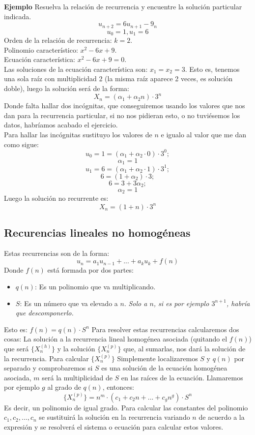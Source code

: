 \documentclass[a4paper]{article}
\theoremstyle{plain} \newtheorem{PrimerPrincipio}{Teorema}
\theoremstyle{plain} \newtheorem{SegundoPrincipio}{Teorema}
\begin{document}
\large{\textbf{Ejemplo}}
Resuelva la relación de recurrencia y encuentre la solución particular indicada.
$$u_{n+2}=6u_{n+1}-9_n$$
$$u_0=1, u_1=6$$
Orden de la relación de recurrencia: $k=2$.\\
Polinomio característico: $x^2-6x+9$.\\
Ecuación característica: $x^2-6x+9=0$.\\
Las soluciones de la ecuación característica son: $x_1=x_2=3$. Esto es, tenemos una sola raíz con multiplicidad 2 (la misma raíz aparece 2 veces, es solución doble), luego la solución será de la forma:
$$X_n=(\alpha_1+\alpha_2n)\cdot 3^n$$
Donde falta hallar dos incógnitas, que conseguiremos usando los valores que nos dan para la recurrencia particular, si no nos pidieran esto, o no tuviésemos los datos, habríamos acabado el ejercicio.\\
Para hallar las incógnitas sustituyo los valores de $n$ e igualo al valor que me dan como sigue:
$$u_0=1=(\alpha_1+\alpha_2\cdot 0)\cdot 3^0;$$
$$\alpha_1=1$$
$$u_1=6=(\alpha_1+\alpha_2\cdot 1)\cdot 3^1;$$
$$6=(1+\alpha_2)\cdot 3;$$
$$6=3+3\alpha_2;$$
$$\alpha_2=1$$
Luego la solución no recurrente es:
$$X_n=(1+n)\cdot 3^n$$

\subsection{Recurencias lineales no homogéneas}
Estas recurrencias son de la forma:
$$u_n=a_1u_{n-1}+...+a_ku_k+f(n)$$
Donde $f(n)$ está formada por dos partes:
\begin{itemize}
\item $q(n)$: Es un polinomio que va multiplicando.
\item $S$: Es un número que va elevado a $n$. \emph{Solo a $n$, si es por ejemplo $3^{n+1}$, habría que descomponerlo.}
\end{itemize}
Esto es: $f(n)=q(n)\cdot S^n$
Para resolver estas recurrencias calcularemos dos cosas: La solución a la recurrencia lineal homogénea asociada (quitando el $f(n)$) que será $\{X_n^{(h)}\}$ y la solución $\{X_n^{(p)}\}$ que, al sumarlas, nos dará la solución de la recurrencia.
Para calcular $\{X_n^{(p)}\}$ Simplemente localizaremos $S$ y $q(n)$ por separado y comprobaremos si $S$ es una solución de la ecuación homogénea asociada, $m$ será la multiplicidad de $S$ en las raíces de la ecuación. Llamaremos por ejemplo $g$ al grado de $q(n)$, entonces:
$$\{X_n^{(p)}\}=n^m\cdot (c_1+c_2n+...+c_gn^g)\cdot S^n$$
Es decir, un polinomio de igual grado. Para calcular las constantes del polinomio $c_1,c_2,...,c_n$ se sustituirá la solución en la recurrencia variando $n$ de acuerdo a la expresión y se resolverá el sistema o ecuación para calcular estos valores.\\
\end{document}
